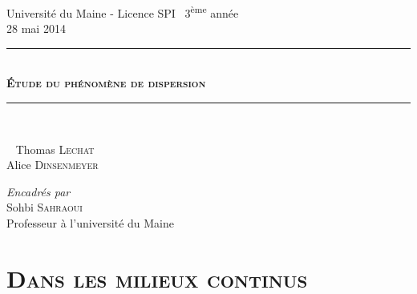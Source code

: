 \documentclass[xcolor=x11names,compress]{beamer}
\renewcommand{\(}{\begin{columns}}
\renewcommand{\)}{\end{columns}}
\newcommand{\<}[1]{\begin{column}{#1}}
\renewcommand{\>}{\end{column}}
\newcommand{\HRule}{\rule{\linewidth}{0.5mm}}
\begin{document}


\begin{frame}
\centering
Université du Maine - Licence SPI~ 3\textsuperscript{ème} année\\
	28 mai 2014
 \vspace{1.4cm}

\HRule \\[0.6cm]
{\large \bfseries \textsc{Étude du phénomène de dispersion}  } \\[0.4cm]
\HRule \\[1.5cm]

\begin{minipage}{0.495\textwidth}
\begin{flushleft}
~\newline
 Thomas \textsc{ Lechat}\\
Alice \textsc{ Dinsenmeyer}\\
\end{flushleft}
\end{minipage}
\begin{minipage}{0.495\textwidth}
\begin{flushright} 
\emph{Encadrés par } \\
 Sohbi \textsc{ Sahraoui} \\
\small Professeur à l'université du Maine
\end{flushright}
\end{minipage}



\titlepage
\end{frame}

\begin{frame}{}
\tableofcontents
\end{frame}


\section{\scshape Dans les milieux continus}
\end{document}

